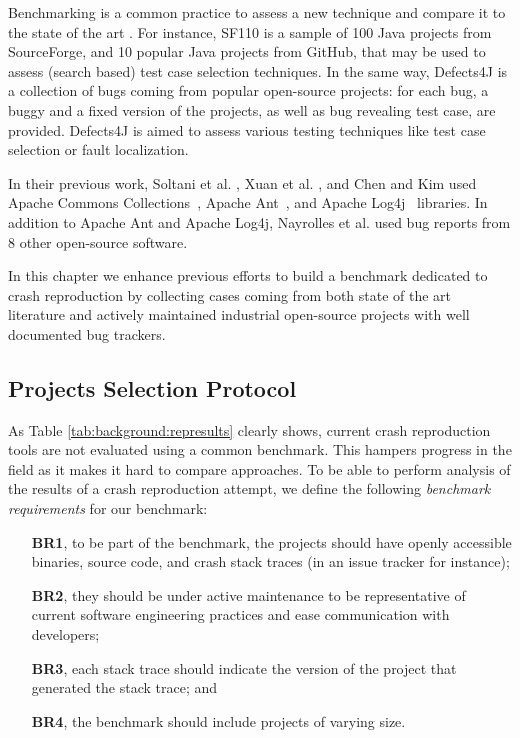 
Benchmarking is a common practice to assess a new technique and compare it to the state of the art \cite{Sim2003}.
For instance, SF110 \cite{Fraser2014b} is a sample of 100 Java projects from SourceForge, and 10 popular Java projects from GitHub, that may be used to assess (search based) test case selection techniques.
In the same way, Defects4J \cite{just2014defects4j} is a collection of bugs coming from popular open-source projects: for each bug, a buggy and a fixed version of the projects, as well as bug revealing test case, are provided. Defects4J is aimed to assess various testing techniques like test case selection or fault localization.

In their previous work, Soltani et al. \cite{soltani2017}, Xuan et al. \cite{Xuan2015}, and Chen and Kim \cite{Chen2015} used Apache Commons Collections~\cite{commonscollections}, Apache Ant~\cite{ant}, and Apache Log4j~\cite{log4j} libraries.
In addition to  Apache Ant and Apache Log4j, Nayrolles et al. \cite{Nayrolles2017} used bug reports from 8 other open-source software.

In this chapter we enhance previous efforts to build a benchmark dedicated to crash reproduction by collecting cases coming from both state of the art literature and actively maintained industrial open-source projects with well documented bug trackers.

\subsection{Projects Selection Protocol}

As Table \ref{tab:background:represults} clearly shows, current crash reproduction tools are not evaluated using a common benchmark.
This hampers progress in the field as it makes it hard to compare approaches.
To be able to perform analysis of the results of a crash reproduction attempt, we define the following \emph{benchmark requirements} for our benchmark:
\begin{itemize}
\item[ \textbf{BR1},] to be part of the benchmark, the projects should have openly accessible binaries, source code, and crash stack traces (in an issue tracker for instance);
\item[ \textbf{BR2},] they should be under active maintenance to be representative of current software engineering practices and ease communication with developers;
\item[ \textbf{BR3},] each stack trace should indicate the version of the project that generated the stack trace; and
\item[ \textbf{BR4},] the benchmark should include projects of varying size.
\end{itemize}

